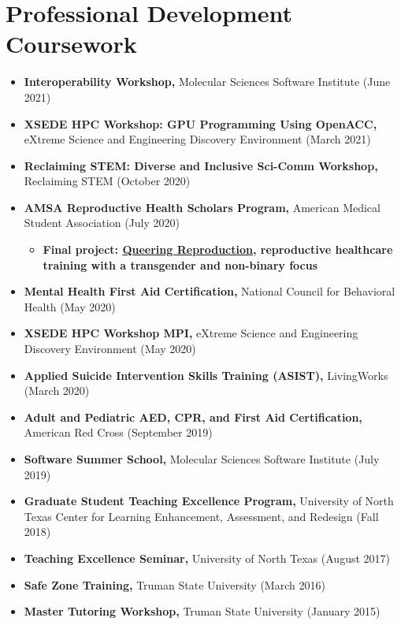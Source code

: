 \documentclass[letterpaper,11pt]{article}
\newcommand{\resumeItem}[2]{
  \item\small{
    \textbf{#1}{ #2 \vspace{-2pt}}
  }
}
\newcommand{\resumeSubItem}[2]{\resumeItem{#1}{#2}\vspace{-4pt}}
\newcommand{\resumeSubHeadingListStart}{\begin{itemize}[leftmargin=*]}
\newcommand{\resumeSubHeadingListEnd}{\end{itemize}}
\newcommand{\resumeItemListStart}{\begin{itemize}}
\newcommand{\resumeItemListEnd}{\end{itemize}\vspace{-5pt}}
\begin{document}
\section{Professional Development Coursework}
  \resumeSubHeadingListStart
    \resumeSubItem{Interoperability Workshop\textnormal{,}}
      {Molecular Sciences Software Institute (June 2021)} %
    \resumeSubItem{XSEDE HPC Workshop: GPU Programming Using OpenACC\textnormal{,}}
      {eXtreme Science and Engineering Discovery Environment (March 2021)} %
    \resumeSubItem{Reclaiming STEM: Diverse and Inclusive Sci-Comm Workshop\textnormal{,}}
      {Reclaiming STEM (October 2020)}
    \resumeSubItem{AMSA Reproductive Health Scholars Program\textnormal{,}}
      {American Medical Student Association (July 2020)}
      \resumeItemListStart
      \resumeItem{\textnormal{Final project: \href{https://queeringreproduction.com}{Queering Reproduction}, reproductive healthcare training with a transgender and non-binary focus}}
        {}
       \resumeItemListEnd
    \resumeSubItem{Mental Health First Aid Certification\textnormal{,}}
      {National Council for Behavioral Health (May 2020)}
    \resumeSubItem{XSEDE HPC Workshop MPI\textnormal{,}}
      {eXtreme Science and Engineering Discovery Environment (May 2020)}  
    \resumeSubItem{Applied Suicide Intervention Skills Training (ASIST)\textnormal{,}}
      {LivingWorks (March 2020)}
    \resumeSubItem{Adult and Pediatric AED, CPR, and First Aid Certification\textnormal{,}}
      {American Red Cross (September 2019)}
    \resumeSubItem{Software Summer School\textnormal{,}}
      {Molecular Sciences Software Institute (July 2019)}
    \resumeSubItem{Graduate Student Teaching Excellence Program\textnormal{,}}
      {University of North Texas Center for Learning Enhancement, Assessment, and Redesign (Fall 2018)}  
    \resumeSubItem{Teaching Excellence Seminar\textnormal{,}}
      {University of North Texas (August 2017)}
    \resumeSubItem{Safe Zone Training\textnormal{,}}
      {Truman State University (March 2016)}
    \resumeSubItem{Master Tutoring Workshop\textnormal{,}}
      {Truman State University (January 2015)}
  \resumeSubHeadingListEnd
\end{document}
